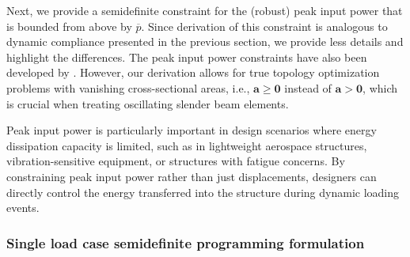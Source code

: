 \documentclass[preprint,3p]{elsarticle}
\numberwithin{equation}{section}
\begin{document}
Next, we provide a semidefinite constraint for the (robust) peak input power that is bounded from above by $\overline{p}$. Since derivation of this constraint is analogous to dynamic compliance presented in the previous section, we provide less details and highlight the differences. The peak input power constraints have also been developed by \citet{Heidari2009optimization}. However, our derivation allows for true topology optimization problems with vanishing cross-sectional areas, i.e., $\mathbf{a}\ge \mathbf{0}$ instead of $\mathbf{a}>\mathbf{0}$, which is crucial when treating oscillating slender beam elements.

Peak input power is particularly important in design scenarios where energy dissipation capacity is limited, such as in lightweight aerospace structures, vibration-sensitive equipment, or structures with fatigue concerns. By constraining peak input power rather than just displacements, designers can directly control the energy transferred into the structure during dynamic loading events.

\subsubsection{Single load case semidefinite programming formulation}
\end{document}
